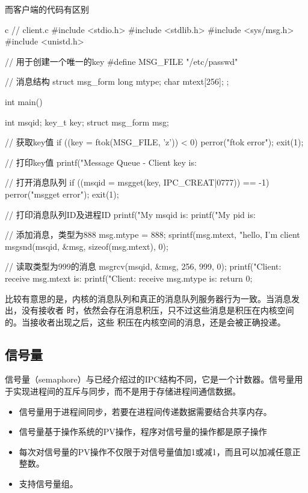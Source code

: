 而客户端的代码有区别
\begin{code-block}{c}
// client.c
#include <stdio.h>
#include <stdlib.h>
#include <sys/msg.h>
#include <unistd.h>

// 用于创建一个唯一的key
#define MSG_FILE "/etc/passwd"

// 消息结构
struct msg_form {
        long mtype;
        char mtext[256];
};

int main()
{
        int msqid;
        key_t key;
        struct msg_form msg;

        // 获取key值
        if ((key = ftok(MSG_FILE, 'z')) < 0)
        {
                perror("ftok error");
                exit(1);
        }

        // 打印key值
        printf("Message Queue - Client key is: %

        // 打开消息队列
        if ((msqid = msgget(key, IPC_CREAT|0777)) == -1)
        {
                perror("msgget error");
                exit(1);
        }

        // 打印消息队列ID及进程ID
        printf("My msqid is: %
        printf("My pid is: %

        // 添加消息，类型为888
        msg.mtype = 888;
        sprintf(msg.mtext, "hello, I'm client %
        msgsnd(msqid, &msg, sizeof(msg.mtext), 0);

        // 读取类型为999的消息
        msgrcv(msqid, &msg, 256, 999, 0);
        printf("Client: receive msg.mtext is: %
        printf("Client: receive msg.mtype is: %
        return 0;
}
\end{code-block}

比较有意思的是，内核的消息队列和真正的消息队列服务器行为一致。当消息发出，没有接收者
时，依然会存在消息积压，只不过这些消息是积压在内核空间的。当接收者出现之后，这些
积压在内核空间的消息，还是会被正确投递。

\subsection{信号量}
信号量（semaphore）与已经介绍过的IPC结构不同，它是一个计数器。信号量用于实现进程间的互斥与同步，而不是用于存储进程间通信数据。
\begin{itemize}
    \item 信号量用于进程间同步，若要在进程间传递数据需要结合共享内存。
    \item 信号量基于操作系统的PV操作，程序对信号量的操作都是原子操作
    \item 每次对信号量的PV操作不仅限于对信号量值加1或减1，而且可以加减任意正整数。
    \item 支持信号量组。
\end{itemize}

